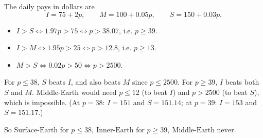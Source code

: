 The daily pays in dollars are
\[I=75+2p,\qquad M=100+0.05p,\qquad S=150+0.03p.\]
\begin{itemize}
\item $I>S\iff1.97p>75\iff p>38.07$, i.e. $p\ge39$.
\item $I>M\iff1.95p>25\iff p>12.8$, i.e. $p\ge13$.
\item $M>S\iff0.02p>50\iff p>2500$.
\end{itemize}
For $p\le38$, $S$ beats $I$, and also beats $M$ since $p\le2500$. For $p\ge39$, $I$ beats both $S$ and $M$. Middle-Earth would need $p\le12$ (to beat $I$) and $p>2500$ (to beat $S$), which is impossible. (At $p=38$: $I=151$ and $S=151.14$; at $p=39$: $I=153$ and $S=151.17$.)

So $\boxed{\text{Surface-Earth for }p\le38,\ \text{Inner-Earth for }p\ge39,\ \text{Middle-Earth never}}$.
